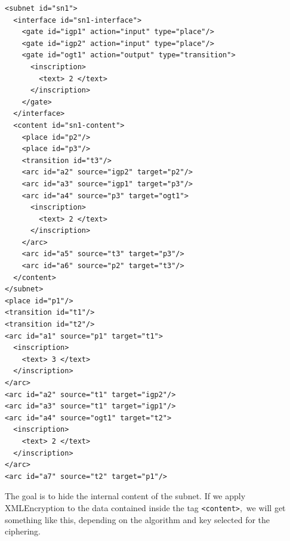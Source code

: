 \begin{lstlisting}
<subnet id="sn1">
  <interface id="sn1-interface">
    <gate id="igp1" action="input" type="place"/>
    <gate id="igp2" action="input" type="place"/>
    <gate id="ogt1" action="output" type="transition">
      <inscription>
        <text> 2 </text>
      </inscription>
    </gate>
  </interface>
  <content id="sn1-content">
    <place id="p2"/>
    <place id="p3"/>
    <transition id="t3"/>
    <arc id="a2" source="igp2" target="p2"/>
    <arc id="a3" source="igp1" target="p3"/>
    <arc id="a4" source="p3" target="ogt1">
      <inscription>
        <text> 2 </text>
      </inscription>
    </arc>
    <arc id="a5" source="t3" target="p3"/>
    <arc id="a6" source="p2" target="t3"/>
  </content>
</subnet>
<place id="p1"/>
<transition id="t1"/>
<transition id="t2"/>
<arc id="a1" source="p1" target="t1">
  <inscription>
    <text> 3 </text>
  </inscription>
</arc>
<arc id="a2" source="t1" target="igp2"/>
<arc id="a3" source="t1" target="igp1"/>
<arc id="a4" source="ogt1" target="t2">
  <inscription>
    <text> 2 </text>
  </inscription>
</arc>
<arc id="a7" source="t2" target="p1"/>
\end{lstlisting}

The goal is to hide the internal content of the subnet. If we apply XMLEncryption
to the data contained inside the tag \texttt{\textless content\textgreater},\ we will get something like this, depending on the algorithm and key selected for the ciphering.


